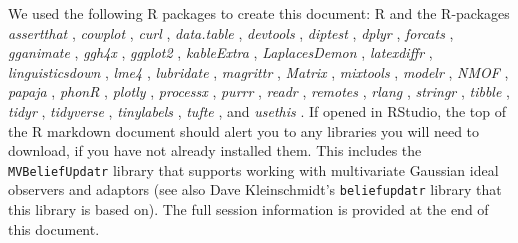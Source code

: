 \documentclass[
  11pt,
  man,floatsintext]{apa6}
\begin{document}
We used the following R packages to create this document: R \autocite[Version 4.3.2;][]{R-base} and the R-packages \emph{assertthat} \autocite[Version 0.2.1;][]{R-assertthat}, \emph{cowplot} \autocite[Version 1.1.3;][]{R-cowplot}, \emph{curl} \autocite[Version 5.2.1;][]{R-curl}, \emph{data.table} \autocite[Version 1.15.4;][]{R-data.table}, \emph{devtools} \autocite[Version 2.4.5;][]{R-devtools}, \emph{diptest} \autocite[Version 0.77.1;][]{R-diptest}, \emph{dplyr} \autocite[Version 1.1.4;][]{R-dplyr}, \emph{forcats} \autocite[Version 1.0.0;][]{R-forcats}, \emph{gganimate} \autocite[Version 1.0.9;][]{R-gganimate}, \emph{ggh4x} \autocite[Version 0.2.8;][]{R-ggh4x}, \emph{ggplot2} \autocite[Version 3.5.1;][]{R-ggplot2}, \emph{kableExtra} \autocite[Version 1.4.0;][]{R-kableExtra}, \emph{LaplacesDemon} \autocite[Version 16.1.6;][]{R-LaplacesDemon}, \emph{latexdiffr} \autocite[Version 0.2.0;][]{R-latexdiffr}, \emph{linguisticsdown} \autocite[Version 1.2.0;][]{R-linguisticsdown}, \emph{lme4} \autocite[Version 1.1.35.3;][]{R-lme4}, \emph{lubridate} \autocite[Version 1.9.3;][]{R-lubridate}, \emph{magrittr} \autocite[Version 2.0.3;][]{R-magrittr}, \emph{Matrix} \autocite[Version 1.6.5;][]{R-Matrix}, \emph{mixtools} \autocite[Version 2.0.0;][]{R-mixtools}, \emph{modelr} \autocite[Version 0.1.11;][]{R-modelr}, \emph{NMOF} \autocite[Version 2.8.0;][]{R-NMOF}, \emph{papaja} \autocite[Version 0.1.1.9,001;][]{R-papaja}, \emph{phonR} \autocite[Version 1.0.7;][]{R-phonR}, \emph{plotly} \autocite[Version 4.10.4;][]{R-plotly}, \emph{processx} \autocite[Version 3.8.4;][]{R-processx}, \emph{purrr} \autocite[Version 1.0.2;][]{R-purrr}, \emph{readr} \autocite[Version 2.1.5;][]{R-readr}, \emph{remotes} \autocite[Version 2.5.0;][]{R-remotes}, \emph{rlang} \autocite[Version 1.1.3;][]{R-rlang}, \emph{stringr} \autocite[Version 1.5.1;][]{R-stringr}, \emph{tibble} \autocite[Version 3.2.1;][]{R-tibble}, \emph{tidyr} \autocite[Version 1.3.1;][]{R-tidyr}, \emph{tidyverse} \autocite[Version 2.0.0;][]{R-tidyverse}, \emph{tinylabels} \autocite[Version 0.2.4;][]{R-tinylabels}, \emph{tufte} \autocite[Version 0.13;][]{R-tufte}, and \emph{usethis} \autocite[Version 2.2.3;][]{R-usethis}. If opened in RStudio, the top of the R markdown document should alert you to any libraries you will need to download, if you have not already installed them. This includes the \texttt{MVBeliefUpdatr} library that supports working with multivariate Gaussian ideal observers and adaptors (see also Dave Kleinschmidt's \texttt{beliefupdatr} library that this library is based on). The full session information is provided at the end of this document.
\end{document}

